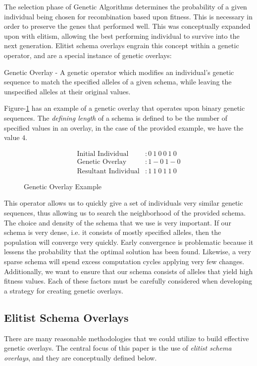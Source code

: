 The selection phase of Genetic Algorithms determines the probability of a given individual being chosen for recombination based upon fitness. This is necessary in order to preserve the genes that performed well. This was conceptually expanded upon with elitism, allowing the best performing individual to survive into the next generation. Elitist schema overlays engrain this concept within a genetic operator, and are a special instance of genetic overlays:

\begin{overlay}
Genetic Overlay - A genetic operator which modifies an individual's genetic sequence to match the specified alleles of a given schema, while leaving the unspecified alleles at their original values. 
\end{overlay}

Figure-\ref{GO-Fig} has an example of a genetic overlay that operates upon binary genetic sequences. The \emph{defining length} of a schema is defined to be the number of specified values in an overlay, in the case of the provided example, we have the value $4$.

\begin{figure}[h!]
\centering 
\begin{align*}
\text{Initial Individual} &: 0~1~0~0~1~0 		\\
\text{Genetic Overlay} &: 1-0~1-0				\\
\text{Resultant Individual} &: 1~1~0~1~1~0			
\end{align*}

\caption{Genetic Overlay Example}
\label{GO-Fig}
\end{figure}


This operator allows us to quickly give a set of individuals very similar genetic sequences, thus allowing us to search the neighborhood of the provided schema. The choice and density of the schema that we use is very important. If our schema is very dense, i.e. it consists of mostly specified alleles, then the population will converge very quickly. Early convergence is problematic because it lessens the probability that the optimal solution has been found\cite{Deb99}. Likewise, a very sparse schema will spend excess computation cycles applying very few changes. Additionally, we want to ensure that our schema consists of alleles that yield high fitness values. Each of these factors must be carefully considered when developing a strategy for creating genetic overlays. 

\subsection*{Elitist Schema Overlays}
There are many reasonable methodologies that we could utilize to build effective genetic overlays. The central focus of this paper is the use of \emph{elitist schema overlays}, and they are conceptually defined below.

